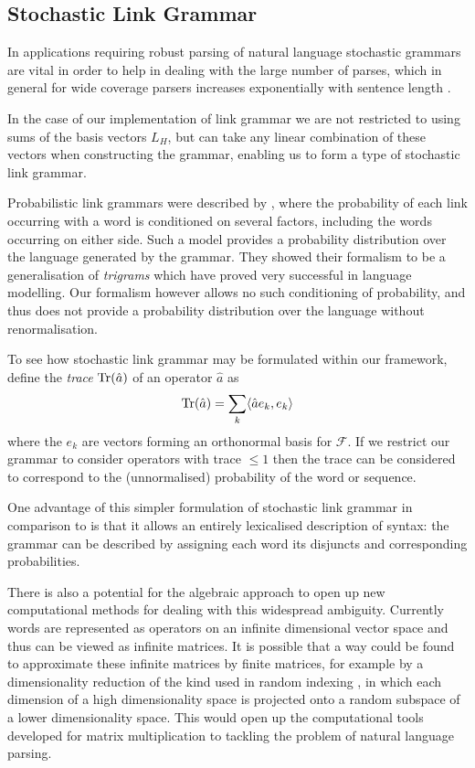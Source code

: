 \documentclass[12pt]{report}
\begin{document}
\subsection{Stochastic Link Grammar}

In applications requiring robust parsing of natural language stochastic grammars are vital in order to help in dealing with the large number of parses, which in general for wide coverage parsers increases exponentially with sentence length \cite{Manning:99}.

In the case of our implementation of link grammar we are not restricted to using sums of the basis vectors $L_H$, but can take any linear combination of these vectors when constructing the grammar, enabling us to form a type of stochastic link grammar.

Probabilistic link grammars were described by \cite{Lafferty:92}, where the probability of each link occurring with a word is conditioned on several factors, including the words occurring on either side. Such a model provides a probability distribution over the language generated by the grammar. They showed their formalism to be a generalisation of \emph{trigrams} which have proved very successful in language modelling. Our formalism however allows no such conditioning of probability, and thus does not provide a probability distribution over the language without renormalisation.

To see how stochastic link grammar may be formulated within our framework, define the \emph{trace} $\mathrm{Tr}(\hat{a})$ of an operator $\hat{a}$ as
$$\mathrm{Tr}(\hat{a}) = \sum_{k} \langle \hat{a}e_k, e_k \rangle$$
where the $e_k$ are vectors forming an orthonormal basis for $\mathcal{F}$. If we restrict our grammar to consider operators with trace $\le 1$ then the trace can be considered to correspond to the (unnormalised) probability of the word or sequence.


One advantage of this simpler formulation of stochastic link grammar in comparison to \cite{Lafferty:92} is that it allows an entirely lexicalised description of syntax: the grammar can be described by assigning each word its disjuncts and corresponding probabilities.

There is also a potential for the algebraic approach to open up new computational methods for dealing with this widespread ambiguity. Currently words are represented as operators on an infinite dimensional vector space and thus can be viewed as infinite matrices. It is possible that a way could be found to approximate these infinite matrices by finite matrices, for example by a dimensionality reduction of the kind used in random indexing \cite{Sahlgren:02}, in which each dimension of a high dimensionality space is projected onto a random subspace of a lower dimensionality space. This would open up the computational tools developed for matrix multiplication to tackling the problem of natural language parsing.
\end{document}
